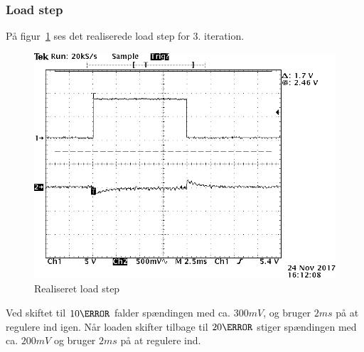 \subsubsection{Load step}
På figur~\ref{fig:Loadstep3} ses det realiserede load step for 3. iteration.
\begin{figure}[H]
	\center
	\includegraphics[max width=0.7\linewidth]{../dokumentation/tex/3iteration/billeder/realisering/Loadstep.PNG}
	\caption{Realiseret load step}
	\label{fig:Loadstep3}
\end{figure} 
Ved skiftet til $10\ohm$ falder spændingen med ca. $300mV$, og bruger $2ms$ på at regulere ind igen. Når loaden skifter tilbage til $20\ohm$ stiger spændingen med ca. $200mV$ og bruger $2ms$ på at regulere ind. 

